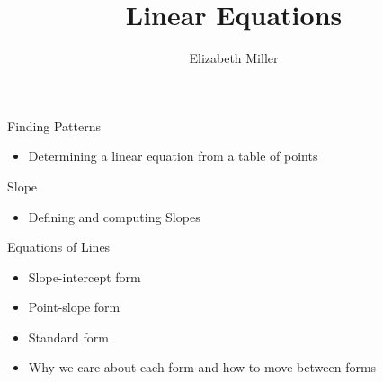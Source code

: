 \documentclass{ximera}
\author{Elizabeth Miller}
\title{Linear Equations}
\begin{document}
\begin{abstract}
\end{abstract}
\maketitle


\begin{objectives}

\item Finding Patterns
\begin{itemize}
	\item Determining a linear equation from a table of points 
\end{itemize}


\item Slope
\begin{itemize}
	\item Defining and computing Slopes  
\end{itemize}



\item Equations of Lines
\begin{itemize}
	\item Slope-intercept form 
	\item Point-slope form 
	\item Standard form 
	\item Why we care about each form and how to move between forms 
\end{itemize}


\end{objectives}
\end{document}
